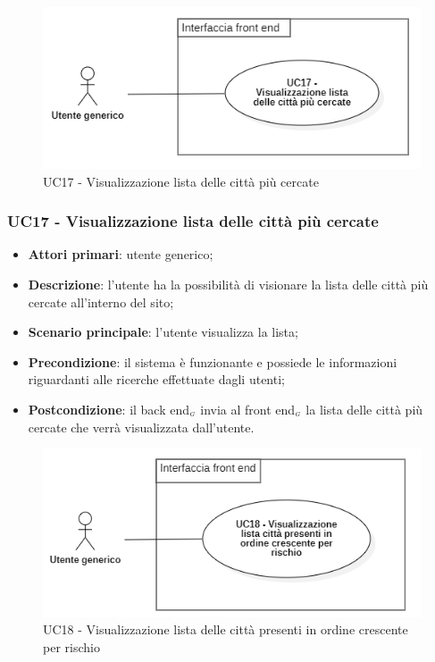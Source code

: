 \begin{center}
	\begin{figure}[H]
		\centering\includegraphics[scale=0.7]{../immagini/attori_casi/uc17.png}
		\caption{UC17 - Visualizzazione lista delle città più cercate}
	\end{figure}
\end{center}


\subsubsection{UC17 - Visualizzazione lista delle città più cercate}\label{CasiDUsoCasiDUsoFacoltativiTraUnUtenteEIlFrontEndElencoCasiDUsoUC17VisualizzazioneListaDelleCittaPiuCercate}

\begin{itemize}
	\item \textbf{Attori primari}: utente generico;
	\item \textbf{Descrizione}: l'utente ha la possibilità di visionare la lista delle città più cercate all'interno del sito;
	\item \textbf{Scenario principale}: l'utente visualizza la lista;
	\item \textbf{Precondizione}: il sistema è funzionante e possiede le informazioni riguardanti alle ricerche effettuate dagli utenti;
	\item \textbf{Postcondizione}: il back end$_{\scaleto{G}{3pt}}$ invia al front end$_{\scaleto{G}{3pt}}$ la lista delle città più cercate che verrà visualizzata dall'utente.
\end{itemize}



\begin{center}
	\begin{figure}[H]
		\centering\includegraphics[scale=0.7]{../immagini/attori_casi/uc18.png}
		\caption{UC18 - Visualizzazione lista delle città presenti in ordine crescente per rischio}
	\end{figure}
\end{center}

